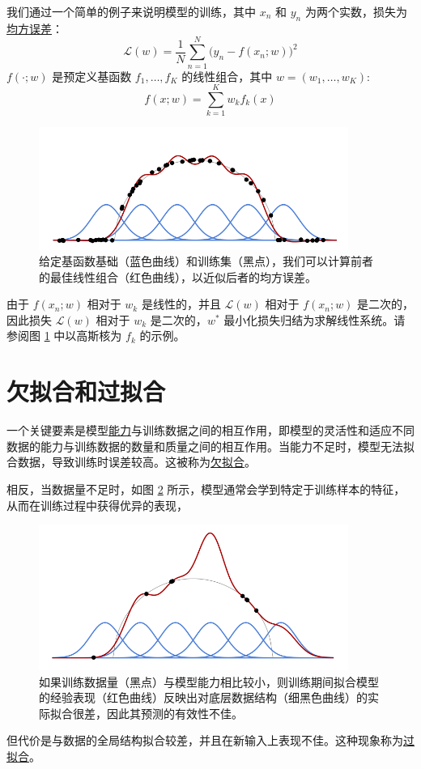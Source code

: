 我们通过一个简单的例子来说明模型的训练，其中 $x_n$ 和 $y_n$ 为两个实数，损失为\underline{均方误差}：
\begin{equation}
    \mathcal{L}(w) = \frac{1}{N}\sum_{n=1}^{N}\big(y_n-f(x_n;w)\big)^2
\end{equation}
$f(\cdot;w)$ 是预定义基函数 $f_1, \dots , f_K$ 的线性组合，其中 $w =(w_1, \dots ,w_K)$:
\[f(x;w) = \sum_{k=1}^{K}w_kf_k(x)\]
\begin{figure}
    \centering
    \includegraphics[width=0.9\textwidth]{fig/fig1.1.png}
    \caption{给定基函数基础（蓝色曲线）和训练集（黑点），我们可以计算前者的最佳线性组合（红色曲线），以近似后者的均方误差。}
    \label{fig1.1}
\end{figure}
由于 $f(x_n;w)$ 相对于 $w_k$ 是线性的，并且 $\mathcal{L}(w)$ 相对于 $f(x_n;w)$ 是二次的，因此损失 $\mathcal{L}(w)$ 相对于 $w_k$ 是二次的，$w^*$ 最小化损失归结为求解线性系统。请参阅图 \ref{fig1.1} 中以高斯核为 $f_k$ 的示例。

\section{欠拟合和过拟合}

一个关键要素是模型\underline{能力}与训练数据之间的相互作用，即模型的灵活性和适应不同数据的能力与训练数据的数量和质量之间的相互作用。当能力不足时，模型无法拟合数据，导致训练时误差较高。这被称为\underline{欠拟合}。

相反，当数据量不足时，如图 \ref{fig1.2} 所示，模型通常会学到特定于训练样本的特征，从而在训练过程中获得优异的表现，
\begin{figure}
    \centering
    \includegraphics[width=0.9\textwidth]{fig/fig1.2.png}
    \caption{如果训练数据量（黑点）与模型能力相比较小，则训练期间拟合模型的经验表现（红色曲线）反映出对底层数据结构（细黑色曲线）的实际拟合很差，因此其预测的有效性不佳。}
    \label{fig1.2}
\end{figure}
但代价是与数据的全局结构拟合较差，并且在新输入上表现不佳。这种现象称为\underline{过拟合}。

